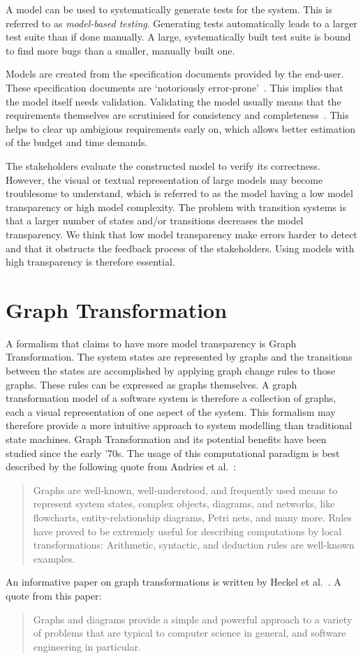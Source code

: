 A model can be used to systematically generate tests for the system. This is referred to as \textit{model-based testing}. Generating tests automatically leads to a larger test suite than if done manually. A large, systematically built test suite is bound to find more bugs than a smaller, manually built one.

Models are created from the specification documents provided by the end-user. These specification documents are `notoriously error-prone'~\cite{McCabe:testing}. This implies that the model itself needs validation. Validating the model usually means that the requirements themselves are scrutinised for consistency and completeness~\cite{Utting:MBTTaxonomy}. This helps to clear up ambigious requirements early on, which allows better estimation of the budget and time demands.

The stakeholders evaluate the constructed model to verify its correctness. However, the visual or textual representation of large models may become troublesome to understand, which is referred to as the model having a low model transparency or high model complexity. The problem with transition systems is that a larger number of states and/or transitions decreases the model transparency. We think that low model transparency make errors harder to detect and that it obstructs the feedback process of the stakeholders. Using models with high transparency is therefore essential.

\section{Graph Transformation}
A formalism that claims to have more model transparency is Graph Transformation. The system states are represented by graphs and the transitions between the states are accomplished by applying graph change rules to those graphs. These rules can be expressed as graphs themselves. A graph transformation model of a software system is therefore a collection of graphs, each a visual representation of one aspect of the system. This formalism may therefore provide a more intuitive approach to system modelling than traditional state machines. Graph Transformation and its potential benefits have been studied since the early '70s. The usage of this computational paradigm is best described by the following quote from Andries et al.~\cite{Andries1999}: \begin{quote}Graphs are well-known, well-understood, and frequently used means to represent system states, complex objects, diagrams, and networks, like flowcharts, entity-relationship diagrams, Petri nets, and many more. Rules have proved to be extremely useful for describing computations by local transformations: Arithmetic, syntactic, and deduction rules are well-known examples.\end{quote} An informative paper on graph transformations is written by Heckel et al.~\cite{Heckel2006187}. A quote from this paper: \begin{quote}Graphs and diagrams provide a simple and powerful approach to a variety of problems that are typical to computer science in general, and software engineering in particular.\end{quote}

